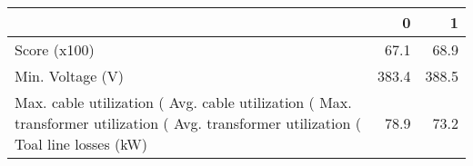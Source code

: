 \begin{tabular}{lrr}
\toprule
 & 0 & 1 \\
\midrule
Score (x100) & 67.1 & 68.9 \\
Min. Voltage (V) & 383.4 & 388.5 \\
Max. cable utilization (%
Avg. cable utilization (%
Max. transformer utilization (%
Avg. transformer utilization (%
Toal line losses (kW) & 78.9 & 73.2 \\
\bottomrule
\end{tabular}
